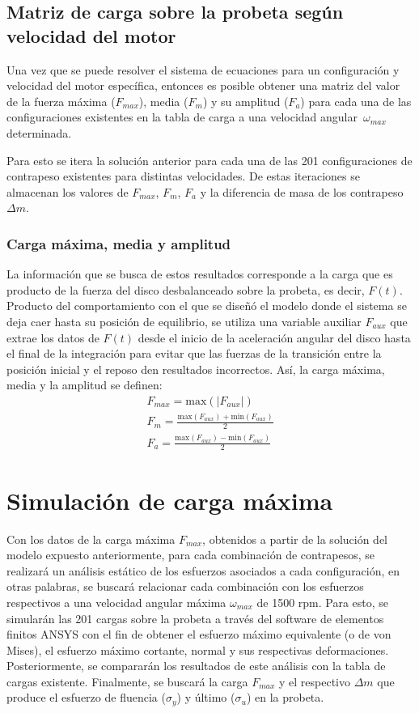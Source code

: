 \subsection{Matriz de carga sobre la probeta según velocidad del motor}
Una vez que se puede resolver el sistema de ecuaciones para un configuración y velocidad del motor específica, entonces es posible obtener una matriz del valor de la fuerza máxima ($F_{max}$), media ($F_m$) y su amplitud ($F_a$) para cada una de las configuraciones existentes en la tabla de carga a una velocidad angular $\,\omega_{max}\,$ determinada.

Para esto se itera la solución anterior para cada una de las 201 configuraciones de contrapeso existentes para distintas velocidades. De estas iteraciones se almacenan los valores de $F_{max}$, $F_m$, $F_a$ y la diferencia de masa de los contrapeso $\Delta m$. 

\subsubsection{Carga máxima, media y amplitud}
La información que se busca de estos resultados corresponde a la carga que es producto de la fuerza del disco desbalanceado sobre la probeta, es decir, $F(t)$. Producto del comportamiento con el que se diseñó el modelo donde el sistema se deja caer hasta su posición de equilibrio,  se utiliza una variable auxiliar $F_{aux}$ que extrae los datos de $F(t)$ desde el inicio de la aceleración angular del disco hasta el final de la integración para evitar que las fuerzas de la transición entre la posición inicial y el reposo den resultados incorrectos. Así, la carga máxima, media y la amplitud se definen:
\begin{gather} 
	F_{max} = \text{max}(|F_{aux}|) \label{eq:f_max}\\
	F_m = \frac{\text{max}(F_{aux}) + \text{min}(F_{aux})}{2} \label{eq:f_m}\\
	F_a = \frac{\text{max}(F_{aux}) - \text{min}(F_{aux})}{2} \label{eq:f_a}
\end{gather}

\section{Simulación de carga máxima}
Con los datos de la carga máxima $F_{max}$, obtenidos a partir de la solución del modelo expuesto anteriormente, para cada combinación de contrapesos, se realizará un análisis estático de los esfuerzos asociados a cada configuración, en otras palabras, se buscará relacionar cada combinación con los esfuerzos respectivos a una velocidad angular máxima $\omega_{max}$ de 1500 rpm. Para esto, se simularán las 201 cargas sobre la probeta a través del software de elementos finitos ANSYS con el fin de obtener el esfuerzo máximo equivalente (o de von Mises), el esfuerzo máximo cortante, normal y sus respectivas deformaciones. Posteriormente, se compararán los resultados de este análisis con la tabla de cargas existente. Finalmente, se buscará la carga $F_{max}$ y el respectivo $\Delta m$ que produce el esfuerzo de fluencia ($\sigma_y$) y último ($\sigma_u$) en la probeta. 

